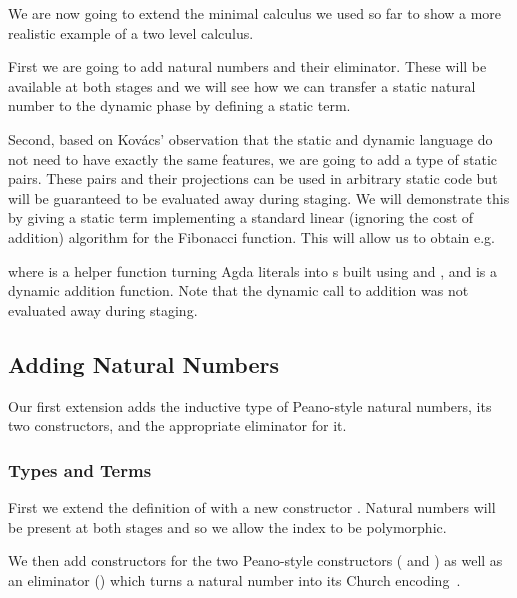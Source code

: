 We are now going to extend the minimal calculus we used so far to
show a more realistic example of a two level calculus.

First we are going to add natural numbers and their eliminator.
These will be available at both stages and we will see how we
can transfer a static natural number to the dynamic phase by
defining a static  term.

Second, based on Kov{\'{a}}cs' observation that the static and
dynamic language do not need to have exactly the same features,
we are going to add a type of static pairs.
%
These pairs and their projections can be used in arbitrary static
code but will be guaranteed to be evaluated away during staging.
%
We will demonstrate this by giving a static term 
implementing a standard linear (ignoring the cost of addition)
algorithm for the Fibonacci function.
%
This will allow us to obtain e.g.


\noindent where  is a helper function turning Agda
literals into s built using  and ,
and  is a dynamic addition function.
%
Note that the dynamic call to addition was not evaluated
away during staging.

\subsection{Adding Natural Numbers}

Our first extension adds the inductive type of Peano-style natural numbers,
its two constructors, and the appropriate eliminator for it.

\subsubsection{Types and Terms}

First we extend the definition of  with a new constructor
. Natural numbers will be present at both stages and so we
allow the index to be polymorphic.


We then add  constructors for the two Peano-style
constructors ( and ) as well as an
eliminator () which turns a natural number into
its Church encoding~\cite[Chapter 3]{church1941calculi}.


